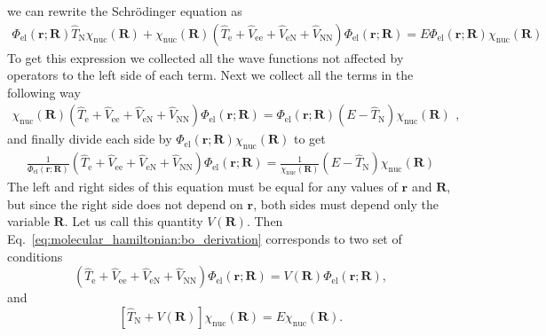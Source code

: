 \documentclass[../Main/chem532-notes.tex]{subfiles}
\begin{document}
 we can rewrite the Schr\"{o}dinger equation as
\begin{equation}
\begin{split}
\Phi_{\mathrm{el}}(\mathbf{r};\mathbf{R})   \hat{T}_\mathrm{N} \chi_{\mathrm{nuc}}(\mathbf{R}) + \chi_{\mathrm{nuc}}(\mathbf{R}) (\hat{T}_\mathrm{e} + \hat{V}_\mathrm{ee} + \hat{V}_\mathrm{eN} +\hat{V}_\mathrm{NN}) \Phi_{\mathrm{el}}(\mathbf{r};\mathbf{R}) 
= E \Phi_{\mathrm{el}}(\mathbf{r};\mathbf{R}) \chi_{\mathrm{nuc}}(\mathbf{R})
\end{split}
\end{equation}
To get this expression we collected all the wave functions not affected by operators to the left side of each term. Next we collect all the terms in the following way
\begin{equation}
\begin{split}
\chi_{\mathrm{nuc}}(\mathbf{R})(\hat{T}_\mathrm{e} + \hat{V}_\mathrm{ee} + \hat{V}_\mathrm{eN} +\hat{V}_\mathrm{NN}) \Phi_{\mathrm{el}}(\mathbf{r};\mathbf{R}) 
=\Phi_{\mathrm{el}}(\mathbf{r};\mathbf{R})    ( E - \hat{ T}_\mathrm{N}) 
\chi_{\mathrm{nuc}}(\mathbf{R})
\end{split},
\end{equation}
and finally divide each side by $\Phi_{\mathrm{el}}(\mathbf{r};\mathbf{R})\chi_{\mathrm{nuc}}(\mathbf{R})$ to get
\begin{equation}
\label{eq:molecular_hamiltonian:bo_derivation}
\begin{split}
\frac{1}{\Phi_{\mathrm{el}}(\mathbf{r};\mathbf{R}) } (\hat{T}_\mathrm{e} + \hat{V}_\mathrm{ee} + \hat{V}_\mathrm{eN} +\hat{V}_\mathrm{NN}) \Phi_{\mathrm{el}}(\mathbf{r};\mathbf{R}) = \frac{1}{\chi_{\mathrm{nuc}}(\mathbf{R})
}  ( E - \hat{ T}_\mathrm{N}) 
\chi_{\mathrm{nuc}}(\mathbf{R})
\end{split}
\end{equation}
The left and right sides of this equation must be equal for any values of $\mathbf{r}$ and $\mathbf{R}$, but since the right side does not depend on $\mathbf{r}$, both sides must depend only the variable $\mathbf{R}$.
Let us call this quantity $V(\mathbf{R})$.
Then Eq.~\eqref{eq:molecular_hamiltonian:bo_derivation} corresponds to two set of conditions
\begin{equation}
\label{eq:molecular_hamiltonian:electronic_se}
(\hat{T}_\mathrm{e} + \hat{V}_\mathrm{ee} + \hat{V}_\mathrm{eN} +\hat{V}_\mathrm{NN} ) \Phi_{\mathrm{el}}(\mathbf{r};\mathbf{R}) = V(\mathbf{R}) \Phi_{\mathrm{el}}(\mathbf{r};\mathbf{R}),
\end{equation}
and
\begin{equation}
\label{eq:molecular_hamiltonian:nuclear_se}
[\hat{ T}_\mathrm{N} + V(\mathbf{R}) ] \chi_{\mathrm{nuc}}(\mathbf{R})  =E \chi_{\mathrm{nuc}}(\mathbf{R}).
\end{equation}
\end{document}
